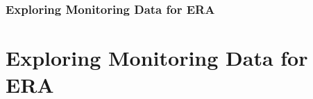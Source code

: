 \documentclass[
	10pt
	]{beamer}
\begin{document}
\begin{frame}
\frametitle{Exploring Monitoring Data for ERA}
 \resizebox{11.5cm}{!}{%
				
				}
\end{frame}



\section{Exploring Monitoring Data for ERA}


\end{document}
